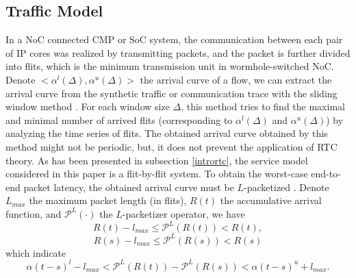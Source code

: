 \documentclass[10pt,journal]{IEEEtran}
\begin{document}
\subsection{Traffic Model}\label{traffic}
In a NoC connected CMP or SoC system, the communication between each pair of IP cores was realized by transmitting packets, and the packet is further divided into flits, which is the minimum transmission unit in wormhole-switched NoC. Denote $<\alpha^l(\Delta),\alpha^u(\Delta)>$ the arrival curve of a flow, we can extract the arrival curve from the synthetic traffic or communication trace with the sliding window method \cite{1253607}. For each window size $\Delta$, this method tries to find the maximal and minimal number of arrived flits (corresponding to $\alpha^l(\Delta)$ and $\alpha^u(\Delta)$) by analyzing the time series of flits. The obtained arrival curve obtained by this method might not be periodic, but, it does not prevent the application of RTC theory. As has been presented in subsection \ref{intrortc}, the service model considered in this paper is a flit-by-flit system. To obtain the worst-case end-to-end packet latency, the obtained arrival curve must be $L$-packetized \cite{Boudec2001Network}. Denote $L_{max}$ the maximum packet length (in flits), $R(t)$ the accumulative arrival function, and $\mathcal{P}^L(\cdot)$ the $L$-packetizer operator, we have
$$R(t)-l_{max}\leq \mathcal{P}^L(R(t))<R(t),$$
$$R(s)-l_{max}\leq \mathcal{P}^L(R(s))<R(s)$$
which indicate
$$\alpha(t-s)^l-l_{max}<\mathcal{P}^L(R(t))-\mathcal{P}^L(R(s))<\alpha(t-s)^u+l_{max}.$$
\end{document}
